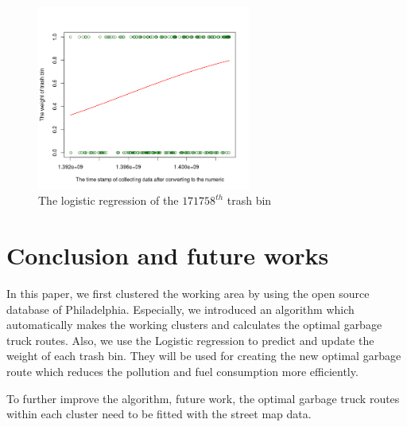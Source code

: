 \documentclass[conference]{IEEEtran}
\begin{document}
\begin{figure}
	\centering
	\includegraphics[width=7cm]{regression}
	\caption{The logistic regression of the $171758^{th}$ trash bin}
	\label{fig6}
\end{figure}

\section{Conclusion and future works}

In this paper, we first clustered the working area by using the open source database of Philadelphia. Especially, we introduced an algorithm which automatically makes the working clusters and calculates the optimal garbage truck routes. Also, we use the Logistic regression to predict and update the weight of each trash bin. They will be used for creating the new optimal garbage route which reduces the pollution and fuel consumption more efficiently.  

To further improve the algorithm, future work, the optimal garbage truck routes within each cluster need to be fitted with the street map data.


%
%
\end{document}
